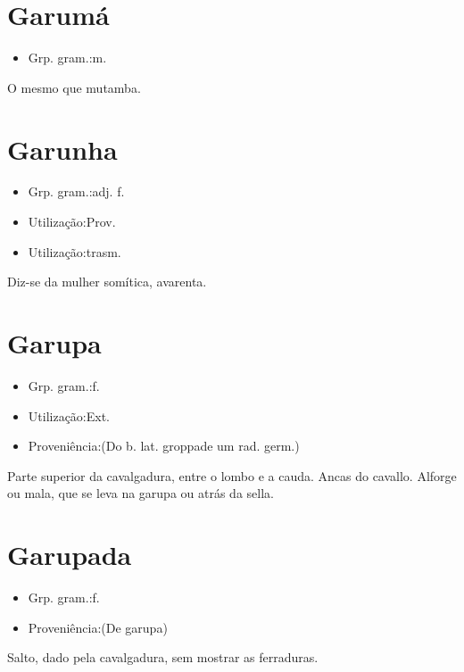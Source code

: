 \section{Garumá}
\begin{itemize}
\item {Grp. gram.:m.}
\end{itemize}
O mesmo que \textunderscore mutamba\textunderscore .
\section{Garunha}
\begin{itemize}
\item {Grp. gram.:adj. f.}
\end{itemize}
\begin{itemize}
\item {Utilização:Prov.}
\end{itemize}
\begin{itemize}
\item {Utilização:trasm.}
\end{itemize}
Diz-se da mulher somítica, avarenta.
\section{Garupa}
\begin{itemize}
\item {Grp. gram.:f.}
\end{itemize}
\begin{itemize}
\item {Utilização:Ext.}
\end{itemize}
\begin{itemize}
\item {Proveniência:(Do b. lat. \textunderscore groppa\textunderscore  de um rad. germ.)}
\end{itemize}
Parte superior da cavalgadura, entre o lombo e a cauda.
Ancas do cavallo.
Alforge ou mala, que se leva na garupa ou atrás da sella.
\section{Garupada}
\begin{itemize}
\item {Grp. gram.:f.}
\end{itemize}
\begin{itemize}
\item {Proveniência:(De \textunderscore garupa\textunderscore )}
\end{itemize}
Salto, dado pela cavalgadura, sem mostrar as ferraduras.
